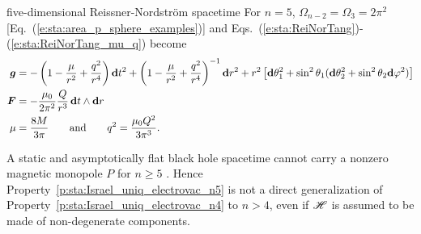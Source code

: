 \begin{texample}{five-dimensional Reissner-Nordström spacetime}{}
For $n=5$, $\Omega_{n-2} = \Omega_3 = 2\pi^2$ [Eq.~(\ref{e:sta:area_p_sphere_examples})]
and Eqs.~(\ref{e:sta:ReiNorTang})-(\ref{e:sta:ReiNorTang_mu_q}) become
\begin{align}
    \bm{g} & =  - \left( 1 - \frac{\mu}{r^2} + \frac{q^2}{r^{4}} \right)  \mathbf{d} t^2
    +  \left( 1 - \frac{\mu}{r^{2}} + \frac{q^2}{r^{4}}  \right) ^{-1} \mathbf{d} r^2
    + r^2 \left[ \mathbf{d}\theta_1^2 + \sin^2\theta_1( \mathbf{d}\theta_2^2 + \sin^2\theta_2 \mathbf{d}\varphi^2 ) \right]
        \nonumber \\
    \bm{F} & = - \frac{\mu_0}{2\pi^2} \frac{Q}{r^3} \,  \mathbf{d} t \wedge \mathbf{d} r  \nonumber \\
    \mu & = \frac{8 M}{3\pi} \qquad\mbox{and}\qquad
    q^2 = \frac{\mu_0 Q^2}{3\pi^3} . \nonumber
\end{align}
\end{texample}


\begin{remark}
A static and asymptotically flat black hole spacetime cannot carry a nonzero magnetic monopole $P$
for $n \geq 5$ \cite{EmparOS10}. Hence Property~\ref{p:sta:Israel_uniq_electrovac_n5}
is not a direct generalization of Property~\ref{p:sta:Israel_uniq_electrovac_n4} to $n > 4$,
even if $\mathscr{H}$ is assumed to be made of non-degenerate components.
\end{remark}

